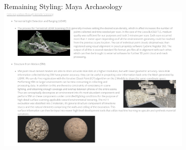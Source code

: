\begin{frame}{Remaining Styling: Maya Archaeology}
    \centering
    \includegraphics[height=0.7\textheight,width=0.7\textwidth,keepaspectratio]{images/maya.png}
\end{frame}








